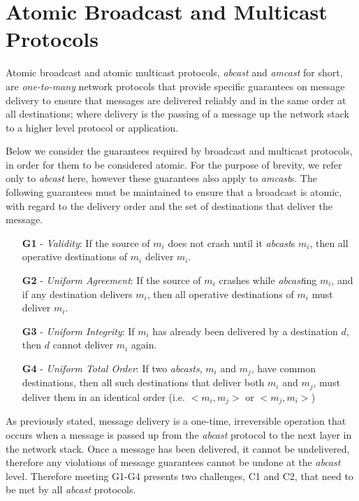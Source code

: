 \section{Atomic Broadcast and Multicast Protocols} \label{atomic_guarantees}
Atomic broadcast and atomic multicast protocols, \emph{abcast} and \emph{amcast} for short, are \emph{one-to-many} network protocols that provide specific guarantees on message delivery to ensure that messages are delivered reliably and in the same order at all destinations; where delivery is the passing of a message up the network stack to a higher level protocol or application.  

Below we consider the guarantees required by broadcast and multicast protocols, in order for them to be considered atomic.  For the purpose of brevity, we refer only to \emph{abcast} here, however these guarantees also apply to \emph{amcast}s.  The following guarantees must be maintained to ensure that a broadcast is atomic, with regard to the delivery order and the set of destinations that deliver the message.  

\begin{itemize}
    \item [\textbf{G1}] - \emph{Validity}: If the source of $m_i$ does not crash until it \emph{abcast}s $m_i$, then all operative destinations of $m_i$ deliver $m_i$.
    \item [\textbf{G2}] - \emph{Uniform Agreement}: If the source of $m_i$ crashes while \emph{abcast}ing $m_i$, and if any destination delivers $m_i$, then all operative
destinations of $m_i$ must deliver $m_i$.
    \item [\textbf{G3}] - \emph{Uniform Integrity}: If $m_i$ has already been delivered by a destination $d$, then $d$ cannot deliver $m_i$ again.  
    \item [\textbf{G4}] - \emph{Uniform Total Order}: If two \emph{\emph{abcast}s}, $m_i$ and $m_j$, have
common destinations, then all such destinations that deliver both $m_i$ and $m_j$, must deliver them in an identical order (i.e. $<m_i, m_j>$ or $<m_j, m_i>$)
\end{itemize}

As previously stated, message delivery is a one-time, irreversible operation that occurs when a message is passed up from the \emph{abcast} protocol to the next layer in the network stack. Once a message has been delivered, it cannot be undelivered, therefore any violations of message guarantees cannot be undone at the \emph{abcast} level.  Therefore meeting G1-G4 presents two challenges, C1 and C2, that need to be met by all \emph{abcast} protocols.

